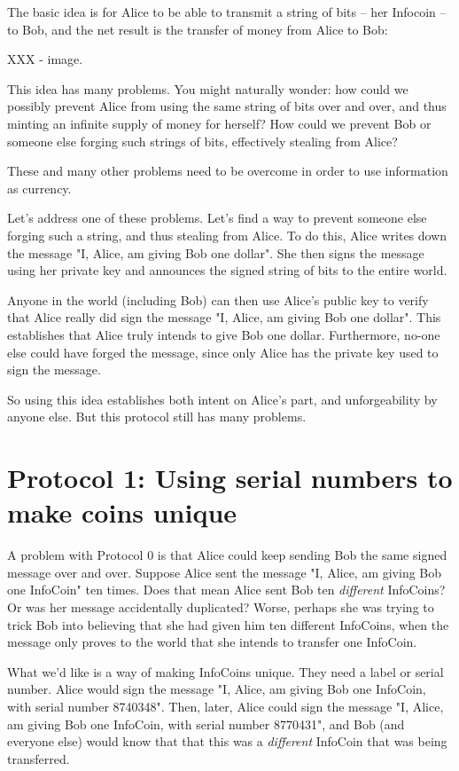 The basic idea is for Alice to be able to transmit a string of bits --
her Infocoin -- to Bob, and the net result is the transfer of money
from Alice to Bob:

XXX - image.

This idea has many problems.  You might naturally wonder: how could we
possibly prevent Alice from using the same string of bits over and
over, and thus minting an infinite supply of money for herself?  How
could we prevent Bob or someone else forging such strings of bits,
effectively stealing from Alice?

These and many other problems need to be overcome in order to use
information as currency.

Let's address one of these problems.  Let's find a way to prevent
someone else forging such a string, and thus stealing from Alice.  To
do this, Alice writes down the message "I, Alice, am giving Bob one
dollar".  She then signs the message using her private key and
announces the signed string of bits to the entire world.

Anyone in the world (including Bob) can then use Alice's public key to
verify that Alice really did sign the message "I, Alice, am giving Bob
one dollar".  This establishes that Alice truly intends to give Bob
one dollar. Furthermore, no-one else could have forged the message,
since only Alice has the private key used to sign the message. 

So using this idea establishes both intent on Alice's part, and
unforgeability by anyone else.  But this protocol still has many
problems.

\section{Protocol 1: Using serial numbers to make coins unique}

A problem with Protocol 0 is that Alice could keep sending Bob the
same signed message over and over.  Suppose Alice sent the message "I,
Alice, am giving Bob one InfoCoin" ten times.  Does that mean Alice
sent Bob ten \emph{different} InfoCoins?  Or was her message
accidentally duplicated?  Worse, perhaps she was trying to trick Bob
into believing that she had given him ten different InfoCoins, when
the message only proves to the world that she intends to transfer one
InfoCoin.

What we'd like is a way of making InfoCoins unique.  They need a label
or serial number.  Alice would sign the message "I, Alice, am giving
Bob one InfoCoin, with serial number 8740348".  Then, later, Alice
could sign the message "I, Alice, am giving Bob one InfoCoin, with
serial number 8770431", and Bob (and everyone else) would know that
that this was a \emph{different} InfoCoin that was being transferred.

